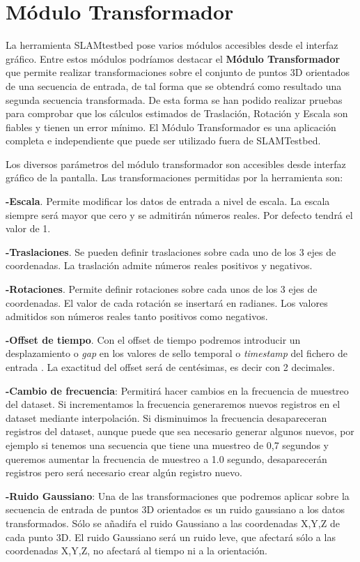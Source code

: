  
\section{Módulo Transformador}
La herramienta SLAMtestbed pose varios módulos accesibles desde el interfaz gráfico. Entre estos módulos podríamos destacar el \textbf{Módulo Transformador} que permite
realizar transformaciones sobre el conjunto de puntos 3D orientados de una secuencia de entrada, de tal forma que se obtendrá como resultado una segunda secuencia transformada. De esta forma se han podido realizar pruebas para comprobar que los cálculos estimados de Traslación, Rotación y Escala son fiables y tienen un error mínimo.
El Módulo Transformador es una aplicación completa e independiente que  puede ser utilizado fuera de SLAMTestbed. 

Los diversos parámetros del módulo transformador son accesibles desde interfaz gráfico de la pantalla. Las transformaciones permitidas por la herramienta son:

\textbf{-Escala}. Permite modificar los datos de entrada a nivel de escala. La escala siempre será mayor que cero y se admitirán números reales. Por defecto tendrá el valor de 1. 

\textbf{-Traslaciones}. Se pueden definir traslaciones sobre cada uno de los 3 ejes de coordenadas. La traslación admite números reales positivos y negativos.

\textbf{-Rotaciones}. Permite definir rotaciones sobre cada unos de los 3 ejes de coordenadas. El valor de cada rotación se insertará en radianes. Los valores admitidos son números reales tanto positivos como negativos. 

\textbf{-Offset de tiempo}. Con el offset de tiempo podremos introducir un desplazamiento o \textit{gap} en los valores de sello temporal o \textit{timestamp} del fichero de entrada . La exactitud del offset será de centésimas, es decir con 2 decimales.

\textbf{-Cambio de frecuencia}: Permitirá hacer cambios en la frecuencia de muestreo del dataset. Si incrementamos la frecuencia generaremos nuevos registros en el dataset mediante interpolación. Si disminuimos la frecuencia desapareceran registros del dataset, aunque puede que sea necesario generar algunos nuevos, por ejemplo si tenemos una secuencia que tiene una muestreo de 0,7 segundos y queremos aumentar la frecuencia de muestreo a 1.0 segundo, desaparecerán registros pero será necesario crear algún registro nuevo.

\textbf{-Ruido Gaussiano}: Una de las transformaciones que podremos aplicar sobre la secuencia de entrada de puntos 3D orientados es un ruido gaussiano a los datos transformados. Sólo se añadiŕa el ruido Gaussiano a las coordenadas X,Y,Z de cada punto 3D.
El ruido Gaussiano será un ruido leve, que afectará sólo a las coordenadas X,Y,Z, no afectará al tiempo ni a la orientación.


